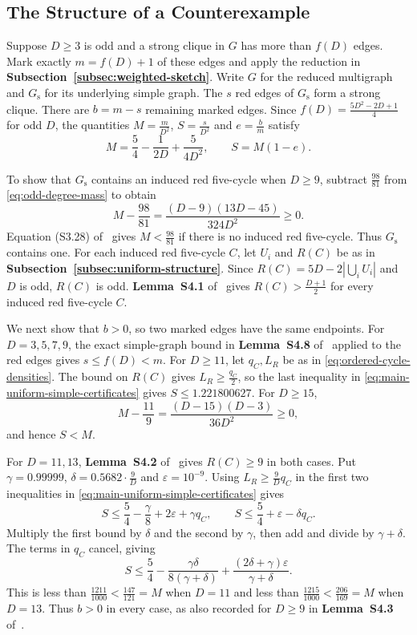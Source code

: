 \documentclass[preprint,11pt,numbers]{elsarticle-arxiv}
\numberwithin{equation}{section}
\theoremstyle{definition}
\begin{document}
\subsection{The Structure of a Counterexample}\label{subsec:exact-structure}

Suppose $D\geq3$ is odd and a strong clique in $G$ has more than
$f(D)$ edges. Mark exactly $m=f(D)+1$ of these edges and apply the
reduction in \textbf{Subsection~\ref{subsec:weighted-sketch}}.
Write $G$ for the reduced multigraph and $G_{\mathrm s}$ for its
underlying simple graph. The $s$ red edges of $G_{\mathrm s}$
form a strong clique. There are $b=m-s$ remaining marked edges.
Since $f(D)=\frac{5D^2-2D+1}{4}$ for odd $D$, the quantities
$M=\frac{m}{D^2}$, $S=\frac{s}{D^2}$ and $e=\frac{b}{m}$ satisfy
\begin{equation}\label{eq:odd-degree-mass}
 M=\frac{5}{4}-\frac{1}{2D}+\frac{5}{4D^2},
 \qquad S=M(1-e).
\end{equation}

To show that $G_{\mathrm s}$ contains an induced red five-cycle
when $D\geq9$, subtract $\frac{98}{81}$ from
\eqref{eq:odd-degree-mass} to obtain
\[
 M-\frac{98}{81}=\frac{(D-9)(13D-45)}{324D^2}\geq0.
\]
Equation (S3.28) of~\cite{FGSTSupplement} gives
$M<\frac{98}{81}$ if there is no induced red five-cycle. Thus
$G_{\mathrm s}$ contains one. For each induced red five-cycle $C$,
let $U_i$ and $R(C)$ be as in
\textbf{Subsection~\ref{subsec:uniform-structure}}. Since
$R(C)=5D-2|\bigcup_i U_i|$ and $D$ is odd, $R(C)$ is odd.
\textbf{Lemma~S4.1} of~\cite{FGSTSupplement} gives
$R(C)>\frac{D+1}{2}$ for every induced red five-cycle $C$.

We next show that $b>0$, so two marked edges have the same
endpoints. For $D=3,5,7,9$, the exact simple-graph bound in
\textbf{Lemma~S4.8} of~\cite{FGSTSupplement}
applied to the red edges gives $s\leq f(D)<m$.
For $D\geq11$, let $q_C,L_R$ be as in
\eqref{eq:ordered-cycle-densities}. The bound on $R(C)$ gives
$L_R\geq\frac{q_C}{2}$, so the last inequality in
\eqref{eq:main-uniform-simple-certificates} gives
$S\leq1.221800627$. For $D\geq15$,
\[
 M-\frac{11}{9}=\frac{(D-15)(D-3)}{36D^2}\geq0,
\]
and hence $S<M$.

For $D=11,13$, \textbf{Lemma~S4.2}
of~\cite{FGSTSupplement} gives $R(C)\geq9$ in both cases.
Put $\gamma=0.99999$, $\delta=0.5682\cdot\frac{9}{D}$ and
$\varepsilon=10^{-9}$. Using $L_R\geq\frac{9}{D}q_C$ in the first
two inequalities in \eqref{eq:main-uniform-simple-certificates}
gives
\[
 S\leq\frac54-\frac{\gamma}{8}+2\varepsilon+\gamma q_C,
 \qquad
 S\leq\frac54+\varepsilon-\delta q_C.
\]
Multiply the first bound by $\delta$ and the second by $\gamma$,
then add and divide by $\gamma+\delta$. The terms in $q_C$
cancel, giving
\[
 S\leq\frac54-\frac{\gamma\delta}{8(\gamma+\delta)}
         +\frac{(2\delta+\gamma)\varepsilon}{\gamma+\delta}.
\]
This is less than $\frac{1211}{1000}<\frac{147}{121}=M$ when
$D=11$ and less than $\frac{1215}{1000}<\frac{206}{169}=M$
when $D=13$. Thus $b>0$ in every case, as also recorded for
$D\geq9$ in \textbf{Lemma~S4.3}
of~\cite{FGSTSupplement}.
\end{document}
